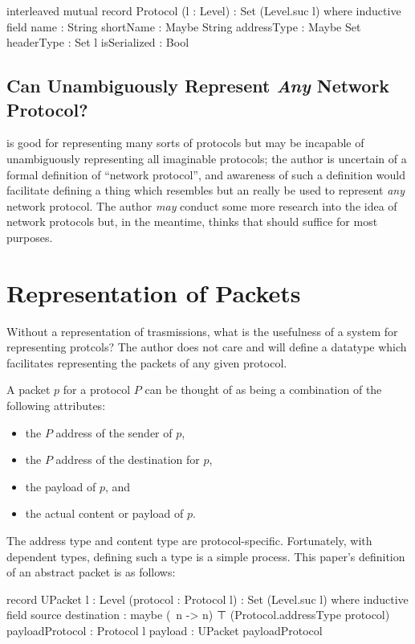 \documentclass{report}
\begin{document}
\begin{code}
  interleaved mutual
    record Protocol (l : Level) : Set (Level.suc l) where
      inductive
      field
        name : String
        shortName : Maybe String
        addressType : Maybe Set
        headerType : Set l
        isSerialized : Bool
\end{code}

\section{Can  Unambiguously Represent \emph{Any} Network Protocol?}
 is good for representing many sorts of protocols but may be incapable of unambiguously representing all imaginable protocols; the author is uncertain of a formal definition of ``network protocol'', and awareness of such a definition would facilitate defining a thing which resembles  but an really be used to represent \emph{any} network protocol.  The author \emph{may} conduct some more research into the idea of network protocols but, in the meantime, thinks that  should suffice for most purposes.

\chapter{Representation of Packets}
Without a representation of trasmissions, what is the usefulness of a system for representing protcols?  The author does not care and will define a datatype which facilitates representing the packets of any given protocol.

A packet \(p\) for a protocol \(P\) can be thought of as being a combination of the following attributes:
\begin{itemize}
  \item the \(P\) address of the sender of \(p\),
  \item the \(P\) address of the destination for \(p\),
  \item the payload of \(p\), and
  \item the actual content or payload of \(p\).
\end{itemize}

The address type and content type are protocol-specific.  Fortunately, with dependent types, defining such a type is a simple process.  This paper's definition of an abstract packet is as follows:

\begin{code}
    record UPacket {l : Level} (protocol : Protocol l) : Set (Level.suc l) where
      inductive
      field
        source
         destination : maybe (\ n -> n) ⊤ (Protocol.addressType protocol)
        payloadProtocol : Protocol l
        payload : UPacket payloadProtocol
\end{code}
\end{document}
